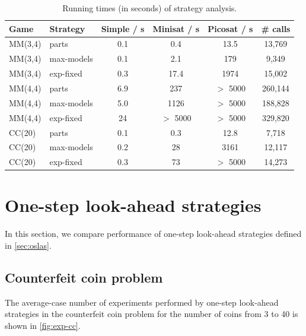 \begin{table}
\begin{center}
\begin{tabular}{|l|l|c|c|c|c|} \hline
Game & Strategy& Simple / s & Minisat / s & Picosat / s & \# calls \\ \hline
MM(3,4) & parts & 0.1 & 0.4 & 13.5 & 13,769 \\
MM(3,4) & max-models & 0.1 & 2.1 & 179 & 9,349 \\
MM(3,4) & exp-fixed & 0.3 & 17.4 & 1974 & 15,002 \\
MM(4,4) & parts & 6.9 & 237 & $>$ 5000 & 260,144 \\
MM(4,4) & max-models & 5.0 & 1126 & $>$ 5000 & 188,828 \\
MM(4,4) & exp-fixed & 24 & $>$ 5000 & $>$ 5000 & 329,820 \\
CC(20) & parts & 0.1 & 0.3 & 12.8 & 7,718 \\
CC(20) & max-models & 0.2 & 28 & 3161 & 12,117 \\
CC(20) & exp-fixed & 0.3 & 73 & $>$ 5000 & 14,273 \\\hline
\end{tabular}
\caption{Running times (in seconds) of strategy analysis.}
\label{tbl:exp-sat-analyse}
\end{center}
\end{table}


\section{One-step look-ahead strategies}

In this section, we compare performance of one-step look-ahead strategies
defined in \autoref{sec:oslas}.

\subsection{Counterfeit coin problem}

The average-case number of experiments performed by one-step look-ahead
  strategies in the counterfeit coin problem
  for the number of coins from 3 to 40 is shown in \autoref{fig:exp-cc}.

